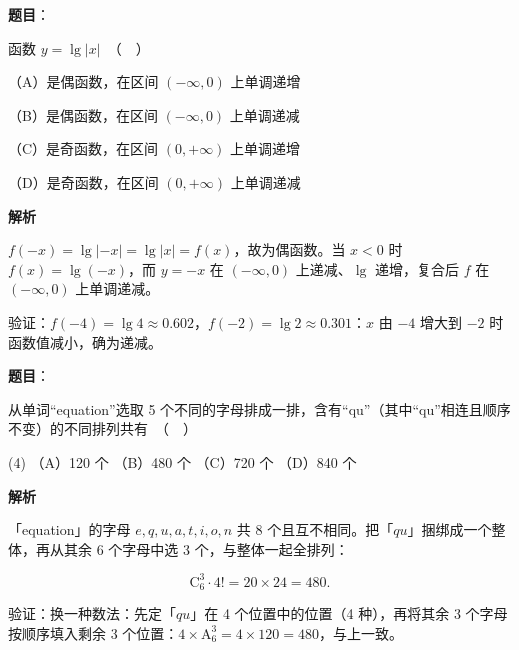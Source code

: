 \begin{answer}

\textbf{题目}：

函数 $y = \lg |x|$　（　）

（A）是偶函数，在区间 $(-\infty, 0)$ 上单调递增

（B）是偶函数，在区间 $(-\infty, 0)$ 上单调递减

（C）是奇函数，在区间 $(0, +\infty)$ 上单调递增

（D）是奇函数，在区间 $(0, +\infty)$ 上单调递减

\textbf{解析}

$f(-x)=\lg|-x|=\lg|x|=f(x)$，故为偶函数。当 $x<0$ 时 $f(x)=\lg(-x)$，而 $y=-x$ 在 $(-\infty,0)$ 上递减、$\lg$ 递增，复合后 $f$ 在 $(-\infty,0)$ 上单调递减。

验证：$f(-4)=\lg4\approx0.602$，$f(-2)=\lg2\approx0.301$：$x$ 由 $-4$ 增大到 $-2$ 时函数值减小，确为递减。


\par\medskip

\end{answer}
\begin{answer}

\textbf{题目}：

从单词“equation”选取 5 个不同的字母排成一排，含有“qu”（其中“qu”相连且顺序不变）的不同排列共有　（　）

\begin{gkopts}(4)
\task （A）120 个
\task （B）480 个
\task （C）720 个
\task （D）840 个
\end{gkopts}

\textbf{解析}

「equation」的字母 $e,q,u,a,t,i,o,n$ 共 8 个且互不相同。把「$qu$」捆绑成一个整体，再从其余 6 个字母中选 3 个，与整体一起全排列：

\nopagebreak[4]
\[\mathrm C_6^3\cdot 4!=20\times24=480 .\]

验证：换一种数法：先定「$qu$」在 4 个位置中的位置（4 种），再将其余 3 个字母按顺序填入剩余 3 个位置：$4\times \mathrm A_6^3=4\times120=480$，与上一致。


\par\medskip

\end{answer}
